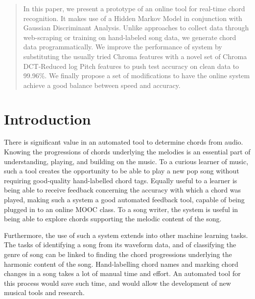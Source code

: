 \documentclass{article}
\begin{document}
 


\begin{abstract} 
In this paper, we present a prototype of an online tool for real-time chord recognition. It makes use of a Hidden Markov Model in conjunction with Gaussian Discriminant Analysis. Unlike approaches to collect data through web-scraping or training on hand-labeled song data, we generate chord data programmatically. We improve the performance of system by substituting the usually tried Chroma features with a novel set of Chroma DCT-Reduced log Pitch features to push test accuracy on clean data to 99.96\%. We finally propose a set of modifications to have the online system achieve a good balance between speed and accuracy.
\end{abstract} 

\section{Introduction}
\label{intro}
There is significant value in an automated tool to determine chords from audio. Knowing the progressions of chords underlying the melodies is an essential part of understanding, playing, and building on the music. To a curious learner of music, such a tool creates the opportunity to be able to play a new pop song without requiring good-quality hand-labelled chord tags. Equally useful to a learner is being able to receive feedback concerning the accuracy with which a chord was played, making such a system a good automated feedback tool, capable of being plugged in to an online MOOC class. To a song writer, the system is useful in being able to explore chords supporting the melodic content of the song.

Furthermore, the use of such a system extends into other machine learning tasks. The tasks of identifying a song from its waveform data, and of classifying the genre of song can be linked to finding the chord progressions underlying the harmonic content of the song. Hand-labelling chord names and marking chord changes in a song takes a lot of manual time and effort. An automated tool for this process would save such time, and would allow the development of new  musical tools and research.
\end{document}
